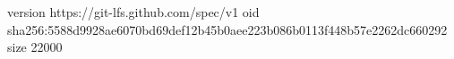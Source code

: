 version https://git-lfs.github.com/spec/v1
oid sha256:5588d9928ae6070bd69def12b45b0aee223b086b0113f448b57e2262dc660292
size 22000

